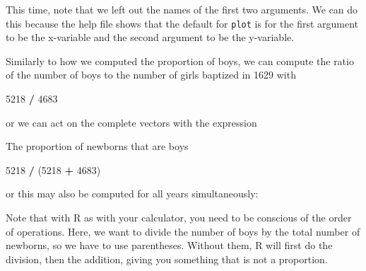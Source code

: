 \documentclass[]{book}
\newenvironment{Shaded}{\begin{snugshade}}{\end{snugshade}}
\newcommand{\DecValTok}[1]{\textcolor[rgb]{0.00,0.00,0.81}{#1}}
\newcommand{\StringTok}[1]{\textcolor[rgb]{0.31,0.60,0.02}{#1}}
\newcommand{\OperatorTok}[1]{\textcolor[rgb]{0.81,0.36,0.00}{\textbf{#1}}}
\newcommand{\NormalTok}[1]{#1}
\theoremstyle{definition}
\theoremstyle{definition}
\theoremstyle{definition}
\theoremstyle{remark}
\begin{document}
This time, note that we left out the names of the first two arguments.
We can do this because the help file shows that the default for
\texttt{plot} is for the first argument to be the x-variable and the
second argument to be the y-variable.

Similarly to how we computed the proportion of boys, we can compute the
ratio of the number of boys to the number of girls baptized in 1629 with

\begin{Shaded}
\begin{Highlighting}[]
\DecValTok{5218} \OperatorTok{/}\StringTok{ }\DecValTok{4683}
\end{Highlighting}
\end{Shaded}

or we can act on the complete vectors with the expression

\begin{Shaded}
\end{Shaded}

The proportion of newborns that are boys

\begin{Shaded}
\begin{Highlighting}[]
\DecValTok{5218} \OperatorTok{/}\StringTok{ }\NormalTok{(}\DecValTok{5218} \OperatorTok{+}\StringTok{ }\DecValTok{4683}\NormalTok{)}
\end{Highlighting}
\end{Shaded}

or this may also be computed for all years simultaneously:

\begin{Shaded}
\end{Shaded}

Note that with R as with your calculator, you need to be conscious of
the order of operations. Here, we want to divide the number of boys by
the total number of newborns, so we have to use parentheses. Without
them, R will first do the division, then the addition, giving you
something that is not a proportion.
\end{document}
